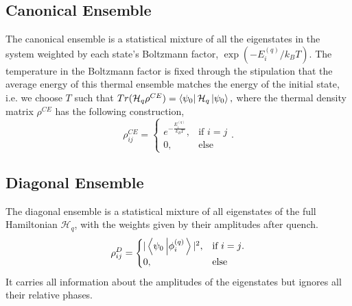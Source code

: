 \subsection*{Canonical Ensemble}
\label{sec:canonical}
The canonical ensemble is a statistical mixture of all the eigenstates in the system weighted by each state's Boltzmann factor, $\exp(-E_i^{(q)}/k_BT)$. The temperature in the Boltzmann factor is fixed through the stipulation that the average energy of this thermal ensemble matches the energy of the initial state, i.e. we choose $T$ such that $Tr(\mathcal H_q \rho^{CE}) = \left\langle \psi_0\right| \mathcal H_q \left|\psi_0\right\rangle,$ where the thermal density matrix $\rho^{CE}$ has the following construction,
\[\rho_{ij}^{CE} = 
\begin{cases} 
e^{-\frac{E_i^{(q)}}{k_B T}}, & \text{if $i = j$} \\
0, & \text{else}
\end{cases}.\]


\subsection*{Diagonal Ensemble}
The diagonal ensemble is a statistical mixture of all eigenstates of the full Hamiltonian $\mathcal H_q$, with the weights given by their amplitudes after quench.
\[
\rho_{ij}^{D}=
\begin{cases}
|\left\langle \psi_0\left|\phi^{(q)}_i\right.\right\rangle|^2 , & \text{if $i=j$.} \\
0, & \text{else}
\end{cases}
\]
It carries all information about the amplitudes of the eigenstates but ignores all their relative phases.
%


